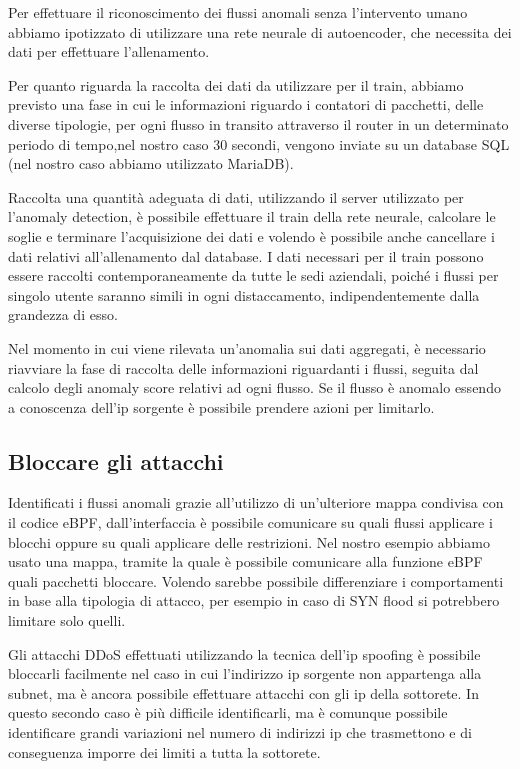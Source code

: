 Per effettuare il riconoscimento dei flussi anomali senza l'intervento umano abbiamo ipotizzato di utilizzare una rete neurale di autoencoder, che necessita dei dati per effettuare l'allenamento.

Per quanto riguarda la raccolta dei dati da utilizzare per il train, abbiamo previsto una fase in cui le informazioni riguardo i contatori di pacchetti, delle diverse tipologie, per ogni flusso in transito attraverso il router in un determinato periodo di tempo,nel nostro caso 30 secondi, vengono inviate su un database SQL (nel nostro caso abbiamo utilizzato MariaDB).

Raccolta una quantità adeguata di dati, utilizzando il server utilizzato per l'anomaly detection, è possibile effettuare il train della rete neurale, calcolare le soglie e terminare l'acquisizione dei dati e volendo è possibile anche cancellare i dati relativi all'allenamento dal database. I dati necessari per il train possono essere raccolti contemporaneamente da tutte le sedi aziendali, poiché i flussi per singolo utente saranno simili in ogni distaccamento, indipendentemente dalla grandezza di esso.

Nel momento in cui viene rilevata un'anomalia sui dati aggregati, è necessario riavviare la fase di raccolta delle informazioni riguardanti i flussi, seguita dal calcolo degli anomaly score relativi ad ogni flusso. Se il flusso è anomalo essendo a conoscenza dell'ip sorgente è possibile prendere azioni per limitarlo.


\subsection{Bloccare gli attacchi}

Identificati i flussi anomali grazie all'utilizzo di un'ulteriore mappa condivisa con il codice eBPF, dall'interfaccia è possibile comunicare su quali flussi applicare i blocchi oppure su quali applicare delle restrizioni.
Nel nostro esempio abbiamo usato una mappa, tramite la quale è possibile comunicare alla funzione eBPF quali pacchetti bloccare. Volendo sarebbe possibile differenziare i comportamenti in base alla tipologia di attacco, per esempio in caso di SYN flood si potrebbero limitare solo quelli.

Gli attacchi DDoS effettuati utilizzando la tecnica dell'ip spoofing è possibile bloccarli facilmente nel caso in cui l'indirizzo ip sorgente non appartenga alla subnet, ma è ancora possibile effettuare attacchi con gli ip della sottorete.
In questo secondo caso è più difficile identificarli, ma è comunque possibile identificare grandi variazioni nel numero di indirizzi ip che trasmettono e di conseguenza imporre dei limiti a tutta la sottorete.

